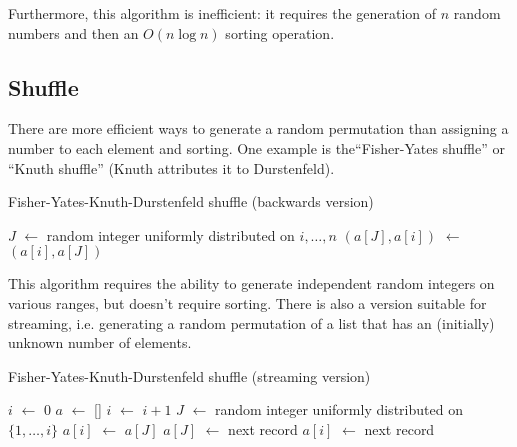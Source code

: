 \documentclass[12pt]{article}
\newcommand*\Let[2]{\State #1 $\gets$ #2}
\begin{document}
Furthermore, this algorithm is inefficient: it requires the generation of $n$ random numbers and then an $O(n\log n)$ sorting operation.

\subsection{Shuffle}
There are more efficient ways to generate a random permutation than assigning a number to each element and sorting.
One example is the``Fisher-Yates shuffle'' or ``Knuth shuffle'' (Knuth attributes it to Durstenfeld).

\begin{algorithm}                      %
\caption{Fisher-Yates-Knuth-Durstenfeld shuffle (backwards version)}          %
\label{FYKD}                           %
\begin{algorithmic}[1]               %
    \Let{$J$}{random integer uniformly distributed on $i, \dots, n$}
    \Let{$(a[J], a[i])$}{$(a[i], a[J])$}
\EndFor
\end{algorithmic}
\end{algorithm}

This algorithm requires the ability to generate independent random integers on various ranges, but doesn't require sorting.
There is also a version suitable for streaming, i.e. generating a random permutation of a list that has an (initially) unknown number of elements.

\begin{algorithm}                      %
\caption{Fisher-Yates-Knuth-Durstenfeld shuffle (streaming version)}          %
\label{FYKD-streaming}                           %
\begin{algorithmic}[1]               %
\Let{$i$}{0}
\Let{$a$}{[]}
    \Let{$i$}{$i+1$}
    \Let{$J$}{random integer uniformly distributed on $\{1, \dots, i\}$}
        \Let{$a[i]$}{$a[J]$}
        \Let{$a[J]$}{next record}
    \Else
        \Let{$a[i]$}{next record} 
    \EndIf
\EndWhile \\
\end{algorithmic}
\end{algorithm}
\end{document}
